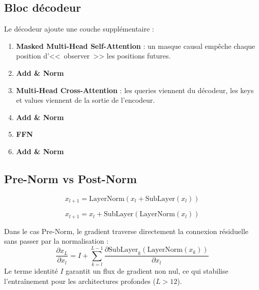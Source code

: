 \subsection{Bloc d\'ecodeur}
\label{sec:decoder-block}

Le d\'ecodeur ajoute une couche suppl\'ementaire :
\begin{enumerate}
    \item \textbf{Masked Multi-Head Self-Attention} : un masque causal emp\^eche chaque position d'<<~observer~>> les positions futures.
    \item \textbf{Add \& Norm}
    \item \textbf{Multi-Head Cross-Attention} : les queries viennent du d\'ecodeur, les keys et values viennent de la sortie de l'encodeur.
    \item \textbf{Add \& Norm}
    \item \textbf{FFN}
    \item \textbf{Add \& Norm}
\end{enumerate}

\subsection{Pre-Norm vs Post-Norm}
\label{sec:pre-post-norm}

\begin{definition}
\begin{equation}
x_{l+1} = \text{LayerNorm}(x_l + \text{SubLayer}(x_l))
\label{eq:post-norm}
\end{equation}
\end{definition}

\begin{definition}
\begin{equation}
x_{l+1} = x_l + \text{SubLayer}(\text{LayerNorm}(x_l))
\label{eq:pre-norm}
\end{equation}
\end{definition}

\begin{proposition}
Dans le cas Pre-Norm, le gradient traverse directement la connexion r\'esiduelle sans passer par la normalisation :
\begin{equation}
\frac{\partial x_L}{\partial x_l} = I + \sum_{k=l}^{L-1} \frac{\partial \text{SubLayer}_k(\text{LayerNorm}(x_k))}{\partial x_l}
\end{equation}
Le terme identit\'e $I$ garantit un flux de gradient non nul, ce qui stabilise l'entra\^inement pour les architectures profondes ($L > 12$).
\end{proposition}

